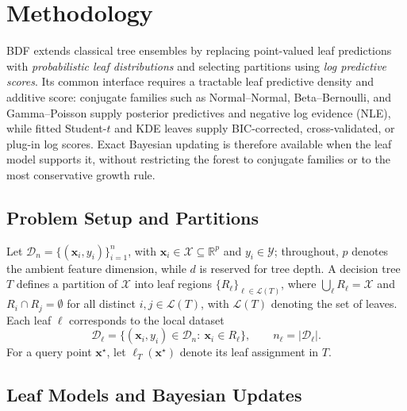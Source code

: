 \documentclass[10pt]{article} %
\begin{document}
\section{Methodology}\label{sec:methodology}

BDF extends classical tree ensembles by replacing point-valued leaf predictions with \emph{probabilistic leaf distributions} and selecting partitions using \emph{log predictive scores}. Its common interface requires a tractable leaf predictive density and additive score: conjugate families such as Normal--Normal, Beta--Bernoulli, and Gamma--Poisson supply posterior predictives and negative log evidence (NLE), while fitted Student-$t$ and KDE leaves supply BIC-corrected, cross-validated, or plug-in log scores. Exact Bayesian updating is therefore available when the leaf model supports it, without restricting the forest to conjugate families or to the most conservative growth rule.

\subsection{Problem Setup and Partitions}

Let $\mathcal{D}_n = \{(\mathbf{x}_i, y_i)\}_{i=1}^n$, with $\mathbf{x}_i \in \mathcal{X}\subseteq \mathbb{R}^p$ and $y_i \in \mathcal{Y}$; throughout, $p$ denotes the ambient feature dimension, while $d$ is reserved for tree depth.
A decision tree $T$ defines a partition of $\mathcal{X}$ into leaf regions $\{R_\ell\}_{\ell\in\mathcal{L}(T)}$, where $\bigcup_{\ell} R_\ell = \mathcal X$ and $R_i \cap R_j = \emptyset$ for all distinct $i, j \in \mathcal L(T)$, with $\mathcal{L}(T)$ denoting the set of leaves.
Each leaf $\ell$ corresponds to the local dataset
\[
\mathcal{D}_\ell = \{(\mathbf{x}_i, y_i)\in \mathcal{D}_n:\ \mathbf{x}_i\in R_\ell\},
\qquad n_\ell = |\mathcal{D}_\ell|.
\]
For a query point $\mathbf{x}^\star$, let $\ell_T(\mathbf{x}^\star)$ denote its leaf assignment in $T$.

\subsection{Leaf Models and Bayesian Updates}\label{subsec:leaf_models}
\end{document}
